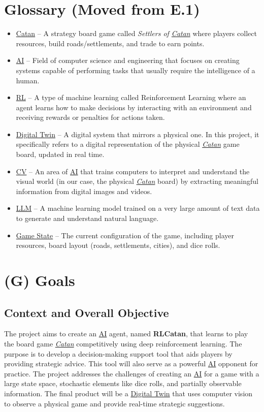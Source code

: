 \documentclass{article}
\newcommand{\Catan}{\href{https://en.wikipedia.org/wiki/Catan}{Catan}}
\newcommand{\AI}{\href{https://en.wikipedia.org/wiki/Artificial_intelligence}{AI}}
\newcommand{\RL}{\href{https://www.ibm.com/think/topics/reinforcement-learning}{RL}}
\newcommand{\DigitalTwin}{\href{https://en.wikipedia.org/wiki/Digital_twin}{Digital Twin}}
\newcommand{\CV}{\href{https://www.ibm.com/think/topics/computer-vision}{CV}}
\newcommand{\LLM}{\href{https://www.cloudflare.com/learning/ai/what-is-large-language-model/}{LLM}}
\newcommand{\GameState}{\href{https://milvus.io/ai-quick-reference/what-is-a-state-in-rl}{Game State}}
\begin{document}
\section*{Glossary (Moved from E.1)}
\begin{itemize}
    \item {\Catan{}} – A strategy board game called \textit{Settlers of \emph{\Catan{}}} where players collect resources, build roads/settlements, and trade to earn points.
    \item {\AI{}} – Field of computer science and engineering that focuses on creating systems capable of performing tasks that usually require the intelligence of a human.
    \item {\RL{}} – A type of machine learning called Reinforcement Learning where an agent learns how to make decisions by interacting with an environment and receiving rewards or penalties for actions taken.
    \item {\DigitalTwin{}} – A digital system that mirrors a physical one. In this project, it specifically refers to a digital representation of the physical \emph{\Catan{}} game board, updated in real time.
    \item {\CV{}} – An area of \AI{} that trains computers to interpret and understand the visual world (in our case, the physical \emph{\Catan{}} board) by extracting meaningful information from digital images and videos.
    \item {\LLM{}} – A machine learning model trained on a very large amount of text data to generate and understand natural language.
    \item {\GameState{}} – The current configuration of the game, including player resources, board layout (roads, settlements, cities), and dice rolls.
\end{itemize}



\section*{(G) Goals}\label{sec:srs-goals}
\renewcommand{\thesubsection}{G.\arabic{subsection}}

\subsection{Context and Overall Objective}\label{subsec:context-and-overall-objective}
The project aims to create an \AI{} agent, named \textbf{RLCatan}, that learns to play the board game \emph{\Catan{}} competitively using deep reinforcement learning. The purpose is to develop a decision-making support tool that aids players by providing strategic advice. This tool will also serve as a powerful \AI{} opponent for practice. The project addresses the challenges of creating an \AI{} for a game with a large state space, stochastic elements like dice rolls, and partially observable information. The final product will be a \DigitalTwin{} that uses computer vision to observe a physical game and provide real-time strategic suggestions.
\end{document}
